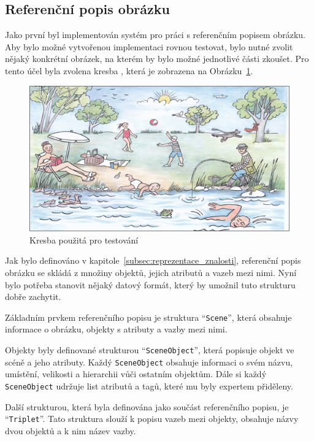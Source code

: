 \subsection{Referenční popis obrázku}\label{subsec:referencni_popis}
Jako první byl implementován systém pro práci s referenčním popisem obrázku.
Aby bylo možné vytvořenou implementaci rovnou testovat, bylo nutné zvolit nějaký konkrétní obrázek,
na kterém by bylo možné jednotlivé části zkoušet.
Pro tento účel byla zvolena kresba
,
která je zobrazena na Obrázku~\ref{fig:summer}.

\begin{figure}[ht!]
	\centering
	\includegraphics[width=\textwidth]{./src/imgs/summer.png}
	\caption{Kresba použitá pro testování}\label{fig:summer}
\end{figure}

Jak bylo definováno v kapitole~\ref{subsec:reprezentace_znalosti}, referenční popis obrázku se skládá z
množiny objektů, jejich atributů a vazeb mezi nimi.
Nyní bylo potřeba stanovit nějaký datový formát, který by umožnil tuto strukturu dobře zachytit.

\newpage
Základním prvkem referenčního popisu je struktura \enquote{\texttt{Scene}}, která obsahuje informace o obrázku, objekty s atributy a vazby mezi nimi.

Objekty byly definované strukturou \enquote{\texttt{SceneObject}}, která popisuje objekt ve scéně a jeho atributy.
Každý \texttt{SceneObject} obsahuje informaci o svém názvu, umístění, velikosti a hierarchii vůči ostatním objektům.
Dále si každý \texttt{SceneObject} udržuje list atributů a tagů, které mu byly expertem přiděleny.

Další strukturou, která byla definována jako součást referenčního popisu, je \enquote{\texttt{Triplet}}.
Tato struktura slouží k popisu vazeb mezi objekty, obsahuje názvy dvou objektů a k nim název vazby.

